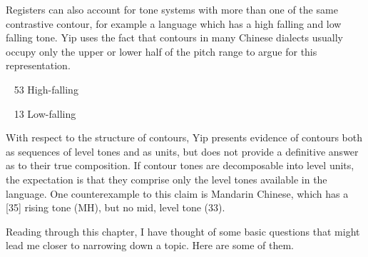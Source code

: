 \documentclass{article}
\begin{document}
Registers can also account for tone systems with more than one of the same contrastive contour, for example a language which has a high falling and low falling tone. Yip uses the fact that contours in many Chinese dialects usually occupy only the upper or lower half of the pitch range to argue for this representation.
\begin{exe}
\ex
{}
~ 53 High-falling
\hspace{2cm}
~ 13 Low-falling
\end{exe}
\par With respect to the structure of contours, Yip presents evidence of contours both as sequences of level tones and as units, but does not provide a definitive answer as to their true composition. If contour tones are decomposable into level units, the expectation is that they comprise only the level tones available in the language. One counterexample to this claim is Mandarin Chinese, which has a [35] rising tone (MH), but no mid, level tone (33).
\par Reading through this chapter, I have thought of some basic questions that might lead me closer to narrowing down a topic. Here are some of them.
\end{document}
